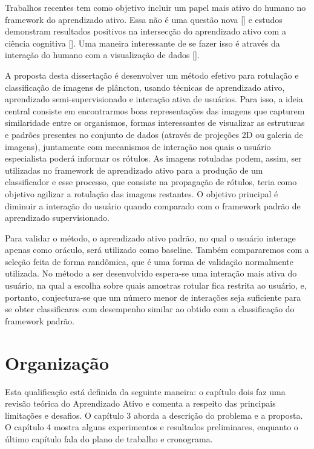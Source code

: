 Trabalhos recentes tem como objetivo incluir um papel mais ativo do humano no framework do aprendizado ativo. Essa não é uma questão nova [\cite{castro2009human, dasgupta2011two}] e estudos demonstram resultados positivos na intersecção do aprendizado ativo com a ciência cognitiva [\cite{kottke2018other}]. Uma maneira interessante de se fazer isso é através da interação do humano com a visualização de dados [\cite{yang2018visually, bernard2018comparing, weigl2016mapview}].  


A proposta desta dissertação é desenvolver um método efetivo para rotulação e classificação de imagens de plâncton, usando técnicas de aprendizado ativo, aprendizado semi-supervisionado e interação ativa de usuários. Para isso, a ideia central consiste em encontrarmos boas representações das imagens que capturem similaridade entre os organismos, formas interessantes de visualizar as estruturas e padrões presentes no conjunto de dados (através de projeções 2D ou galeria de imagens), juntamente com mecanismos de interação nos quais o usuário especialista poderá informar os rótulos. As imagens rotuladas podem, assim, ser utilizadas no framework de aprendizado ativo para a produção de um classificador e esse processo, que consiste na propagação de rótulos, teria como objetivo agilizar a rotulação das imagens restantes. O objetivo principal é diminuir a interação do usuário quando comparado com o framework padrão de aprendizado supervisionado. 

Para validar o método, o aprendizado ativo padrão, no qual o usuário interage apenas como oráculo, será utilizado como baseline. Também compararemos com a seleção feita de forma randômica, que é uma forma de validação normalmente utilizada. No método a ser desenvolvido espera-se uma interação mais ativa do usuário, na qual a escolha sobre quais amostras rotular fica restrita ao usuário, e, portanto, conjectura-se que um número menor de interações seja suficiente para se obter classificares com desempenho similar ao obtido com a classificação do framework padrão.




\section{Organização}
\label{sec:intro_organizacao}

Esta qualificação está definida da seguinte maneira: o capítulo dois faz uma revisão teórica do Aprendizado Ativo e comenta a respeito das principais limitações e desafios. O capítulo 3 aborda a descrição do problema e a proposta. O capítulo 4 mostra alguns experimentos e resultados preliminares, enquanto o último capítulo fala do plano de trabalho e cronograma.